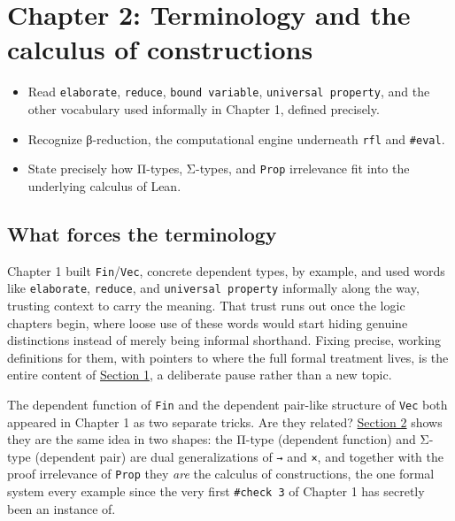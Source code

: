\chapter{Chapter 2: Terminology and the calculus of constructions}\label{sec:02-terminology-and-coc:00-index:1}

\begin{learningobjectives}
\begin{itemize}
\tightlist
\item
  Read \texttt{elaborate}, \texttt{reduce}, \texttt{bound variable}, \texttt{universal property}, and the other vocabulary used informally in Chapter 1, defined precisely.
\item
  Recognize β-reduction, the computational engine underneath \texttt{rfl} and \texttt{\#eval}.
\item
  State precisely how Π-types, Σ-types, and \texttt{Prop} irrelevance fit into the underlying calculus of Lean.
\end{itemize}
\end{learningobjectives}


\section{What forces the terminology}\label{sec:02-terminology-and-coc:00-index:2}

Chapter 1 built \texttt{Fin}/\texttt{Vec}, concrete dependent types, by example, and used words like \texttt{elaborate}, \texttt{reduce}, and \texttt{universal property} informally along the way, trusting context to carry the meaning. That trust runs out once the logic chapters begin, where loose use of these words would start hiding genuine distinctions instead of merely being informal shorthand. Fixing precise, working definitions for them, with pointers to where the full formal treatment lives, is the entire content of \hyperref[sec:02-terminology-and-coc:01-terminology:1]{Section 1}, a deliberate pause rather than a new topic.

The dependent function of \texttt{Fin} and the dependent pair-like structure of \texttt{Vec} both appeared in Chapter 1 as two separate tricks. Are they related? \hyperref[sec:02-terminology-and-coc:02-pi-sigma-and-coc:1]{Section 2} shows they are the same idea in two shapes: the Π-type (dependent function) and Σ-type (dependent pair) are dual generalizations of \texttt{→} and \texttt{×}, and together with the proof irrelevance of \texttt{Prop} they \emph{are} the calculus of constructions, the one formal system every example since the very first \texttt{\#check 3} of Chapter 1 has secretly been an instance of.

